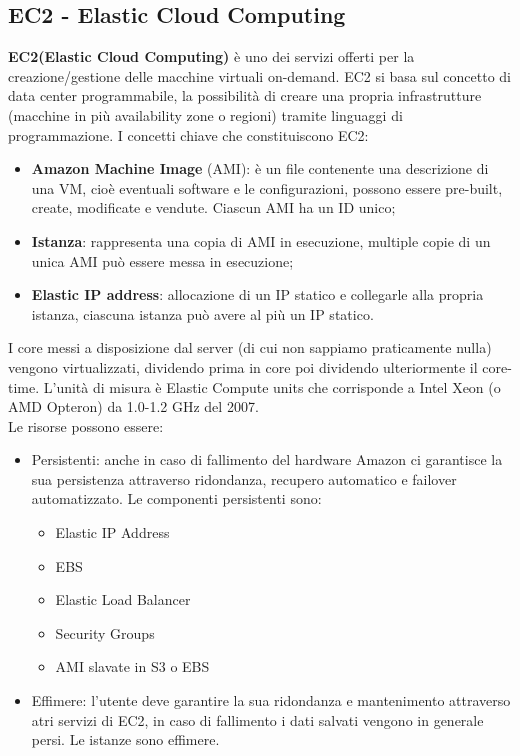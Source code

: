\documentclass[11pt, twocolumn]{article}
\newenvironment{myitemize}
{ \begin{itemize}[topsep=0ex]
		\setlength{\itemsep}{0pt}
		\setlength{\parskip}{0pt}
		\setlength{\parsep}{0pt}     }
	{ \end{itemize}                  }
\begin{document}
\subsection{EC2 - Elastic Cloud Computing}
\textbf{EC2(Elastic Cloud Computing)} è uno dei servizi offerti per la creazione/gestione delle macchine virtuali on-demand. EC2 si basa sul concetto di data center programmabile, la possibilità di creare una propria infrastrutture (macchine in più availability zone o regioni) tramite linguaggi di programmazione.
I concetti chiave che constituiscono EC2:
\begin{myitemize}
	\item \textbf{Amazon Machine Image} (AMI): è un file contenente una descrizione di una VM, cioè eventuali software e le configurazioni, possono essere pre-built, create, modificate e vendute. Ciascun AMI ha un ID unico;
	\item \textbf{Istanza}: rappresenta una copia di AMI in esecuzione, multiple copie di un unica AMI può essere messa in esecuzione;
	\item \textbf{Elastic IP address}: allocazione di un IP statico e collegarle alla propria istanza, ciascuna istanza può avere al più un IP statico.
\end{myitemize}
I core messi a disposizione dal server (di cui non sappiamo praticamente nulla) vengono virtualizzati, dividendo prima in core poi dividendo ulteriormente il core-time. L'unità di misura è Elastic Compute units che corrisponde a Intel Xeon (o AMD Opteron) da 1.0-1.2 GHz del 2007.\\
Le risorse possono essere:
\begin{itemize}[noitemsep,topsep=0ex,wide]
	\item Persistenti: anche in caso di fallimento del hardware Amazon ci garantisce la sua persistenza attraverso ridondanza, recupero automatico e failover automatizzato. Le componenti persistenti sono:
	\begin{myitemize}
		\item Elastic IP Address
		\item EBS
		\item Elastic Load Balancer
		\item Security Groups
		\item AMI slavate in S3 o EBS
	\end{myitemize}
	\item Effimere: l'utente deve garantire la sua ridondanza e mantenimento attraverso atri servizi di EC2, in caso di fallimento i dati salvati vengono in generale persi. Le istanze sono effimere.
\end{itemize}
\end{document}
